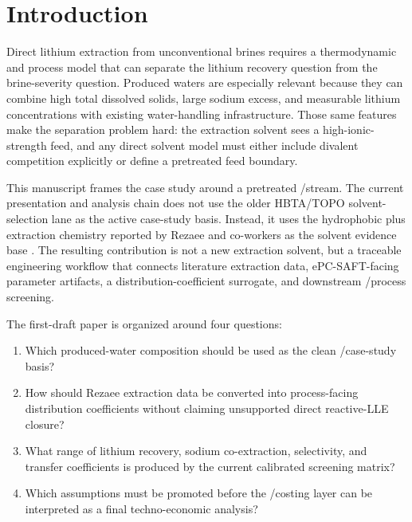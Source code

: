 \section{Introduction}
\label{sec:introduction}

Direct lithium extraction from unconventional brines requires a thermodynamic and process model that can separate the lithium recovery question from the brine-severity question. Produced waters are especially relevant because they can combine high total dissolved solids, large sodium excess, and measurable lithium concentrations with existing water-handling infrastructure. Those same features make the separation problem hard: the extraction solvent sees a high-ionic-strength feed, and any direct solvent model must either include divalent competition explicitly or define a pretreated feed boundary.

This manuscript frames the case study around a pretreated \Smackover \LiIon/\NaIon stream. The current presentation and analysis chain does not use the older HBTA/TOPO solvent-selection lane as the active case-study basis. Instead, it uses the hydrophobic \DES plus \TOPO extraction chemistry reported by Rezaee and co-workers as the solvent evidence base \cite{Rezaee2025RSM,Rezaee2026PCSASFTSI}. The resulting contribution is not a new extraction solvent, but a traceable engineering workflow that connects literature extraction data, ePC-SAFT-facing parameter artifacts, a distribution-coefficient surrogate, and downstream \Prommis/\IDAES process screening.

The first-draft paper is organized around four questions:
\begin{enumerate}
    \item Which produced-water composition should be used as the clean \LiIon/\NaIon case-study basis?
    \item How should Rezaee extraction data be converted into process-facing distribution coefficients without claiming unsupported direct reactive-LLE closure?
    \item What range of lithium recovery, sodium co-extraction, selectivity, and transfer coefficients is produced by the current calibrated screening matrix?
    \item Which assumptions must be promoted before the \Prommis/\IDAES costing layer can be interpreted as a final techno-economic analysis?
\end{enumerate}
